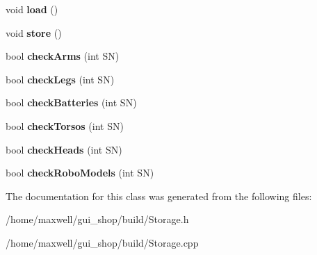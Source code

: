 \begin{DoxyCompactItemize}
\item 
void {\bfseries load} ()\hypertarget{classStorage_a02c0be66527bf53a20dbf618e8fb8595}{}\label{classStorage_a02c0be66527bf53a20dbf618e8fb8595}

\item 
void {\bfseries store} ()\hypertarget{classStorage_ae5e5cd033b9f9790df90dc95e509b427}{}\label{classStorage_ae5e5cd033b9f9790df90dc95e509b427}

\item 
bool {\bfseries check\+Arms} (int SN)\hypertarget{classStorage_a4cb614ae72ef15445ae9f9f50723dc06}{}\label{classStorage_a4cb614ae72ef15445ae9f9f50723dc06}

\item 
bool {\bfseries check\+Legs} (int SN)\hypertarget{classStorage_ad3bf7b0c3db797221c627fc6c9336746}{}\label{classStorage_ad3bf7b0c3db797221c627fc6c9336746}

\item 
bool {\bfseries check\+Batteries} (int SN)\hypertarget{classStorage_a3be0126e7a4e9dba21cbbf43d4973bde}{}\label{classStorage_a3be0126e7a4e9dba21cbbf43d4973bde}

\item 
bool {\bfseries check\+Torsos} (int SN)\hypertarget{classStorage_abfa312b3e266c28c08b22a5fac867411}{}\label{classStorage_abfa312b3e266c28c08b22a5fac867411}

\item 
bool {\bfseries check\+Heads} (int SN)\hypertarget{classStorage_aefd91272d4192a58940e274c2a0a481b}{}\label{classStorage_aefd91272d4192a58940e274c2a0a481b}

\item 
bool {\bfseries check\+Robo\+Models} (int SN)\hypertarget{classStorage_a01c7ed856f04e580b524f93ae96434e4}{}\label{classStorage_a01c7ed856f04e580b524f93ae96434e4}

\end{DoxyCompactItemize}


The documentation for this class was generated from the following files\+:\begin{DoxyCompactItemize}
\item 
/home/maxwell/gui\+\_\+shop/build/Storage.\+h\item 
/home/maxwell/gui\+\_\+shop/build/Storage.\+cpp\end{DoxyCompactItemize}
